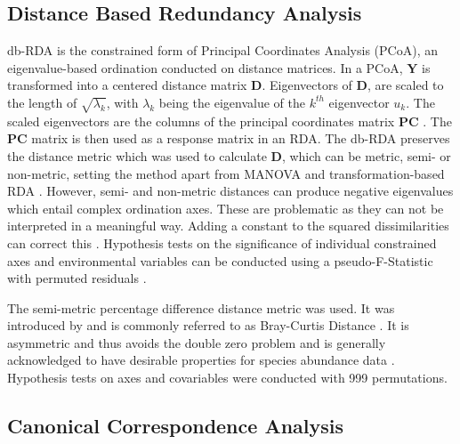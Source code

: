 	\subsection{Distance Based Redundancy Analysis}

		db-RDA  is the constrained form of Principal Coordinates Analysis (PCoA), an eigenvalue-based ordination conducted on distance matrices.
		In a PCoA, $\mathbf{Y}$ is transformed into a centered distance matrix $\mathbf{D}$.
		Eigenvectors of $\mathbf{D}$, are scaled to the length of $\sqrt{\lambda_k}$, with $\lambda_k$ being the eigenvalue of the $k^{th}$ eigenvector $u_k$. 
		The scaled eigenvectors are the columns of the principal coordinates matrix $\mathbf{PC}$ \citep{gower1966some}.
		The $\mathbf{PC}$ matrix is then used as a response matrix in an RDA. 
		The db-RDA preserves the distance metric which was used to calculate $\mathbf{D}$, which can be metric, semi- or non-metric, setting	 the method apart from MANOVA \citep{anderson2001new} and transformation-based RDA \citep{Legendre2001}. 
		However, semi- and non-metric distances can produce negative eigenvalues which entail complex ordination axes. 
		These are problematic as they can not be interpreted in a meaningful way. 
		Adding a constant to the squared dissimilarities can correct this \citep[\textit{Lingoes correction}, ][]{gower1986metric}.
		Hypothesis tests on the significance of individual constrained axes and environmental variables can be conducted using a pseudo-F-Statistic with permuted residuals  \citep{Legendre2011}.
		  	
		The semi-metric percentage difference distance metric was used. 
		It was introduced by \citet{odum1950bird} and is commonly referred to as Bray-Curtis Distance \citep{Legendre2012}.
		It is asymmetric and thus avoids the double zero problem  \citep{Legendre2012} and is generally acknowledged to have desirable properties for species abundance data \citep{bloom1981similarity,faith1987compositional}.
		Hypothesis tests on axes and covariables were conducted with 999 permutations. 

	
	\subsection{Canonical Correspondence Analysis} \label{subsec:CCA}
	
